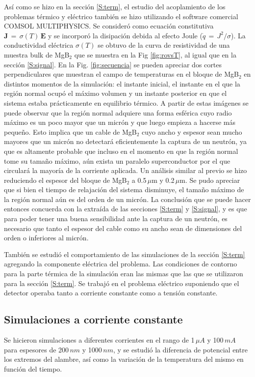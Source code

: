Así como se hizo en la sección \ref{S:term}, el estudio del acoplamiento de los problemas térmico y eléctrico también se hizo utilizando el software comercial COMSOL MULTIPHYSICS. Se consideró como ecuación constitutiva $\mathbf{J} \, = \, \sigma(T) \, \mathbf{E}$ y se incorporó la disipación debida al efecto Joule ($\dot{q} \, = \, J^2/\sigma$). La conductividad eléctrica $\sigma(T)$ se obtuvo de la curva de resistividad de una muestra bulk de MgB$_2$ que se muestra en la Fig \ref{fig:rovsT}, al igual que en la sección \ref{S:signal}. En la Fig. \ref{fig:secuencia} se pueden apreciar dos cortes perpendiculares que muestran el campo de temperaturas en el bloque de MgB$_{2}$ en distintos momentos de la simulación: el instante inicial, el instante en el que la región normal ocupó el máximo volumen y un instante posterior en que el sistema estaba prácticamente en equilibrio térmico. A partir de estas imágenes se puede observar que la región normal adquiere una forma esférica cuyo radio máximo es un poco mayor que un micrón y que luego empieza a hacerse más pequeño. Esto implica que un cable de MgB$_2$ cuyo ancho y espesor sean mucho mayores que un micrón no detectará eficientemente la captura de un neutrón, ya que es altamente probable que incluso en el momento en que la región normal tome su tamaño máximo, aún exista un paralelo superconductor por el que circulará la mayoría de la corriente aplicada. Un análisis similar al previo se hizo reduciendo el espesor del bloque de MgB$_2$ a 0.5\,$\mu$m y 0.2\,$\mu$m. Se pudo apreciar que si bien el tiempo de relajación del sistema disminuye, el tamaño máximo de la región normal aún es del orden de un micrón. La conclusión que se puede hacer entonces concuerda con la extraída de las secciones \ref{S:term} y \ref{S:signal}, y es que para poder tener una buena sensibilidad ante la captura de un neutrón, es necesario que tanto el espesor del cable como su ancho sean de dimensiones del orden o inferiores al micrón.

También se estudió el comportamiento de las simulaciones de la sección \ref{S:term} agregando la componente eléctrica del problema. Las condiciones de contorno para la parte térmica de la simulación eran las mismas que las que se utilizaron para la sección \ref{S:term}. Se trabajó en el problema eléctrico suponiendo que el detector operaba tanto a corriente constante como a tensión constante.
\subsection{Simulaciones a corriente constante}\label{ss:Icte}
Se hicieron simulaciones a diferentes corrientes en el rango de 1\,$\mu A$ y 100\,$m A$ para espesores de 200\,$nm$ y 1000\,$nm$, y se estudió la diferencia de potencial entre los extremos del alambre, así como la variación de la temperatura del mismo en función del tiempo.

